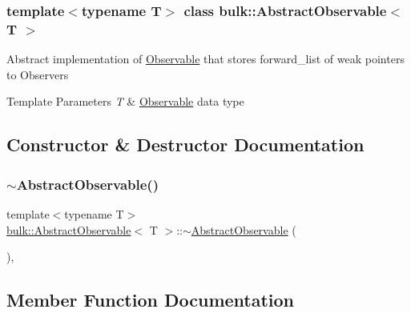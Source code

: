 \subsubsection*{template$<$typename T$>$\newline
class bulk\+::\+Abstract\+Observable$<$ T $>$}

Abstract implementation of \hyperlink{classbulk_1_1Observable}{Observable} that stores forward\+\_\+list of weak pointers to Observers 
\begin{DoxyTemplParams}{Template Parameters}
{\em T} & \hyperlink{classbulk_1_1Observable}{Observable} data type \\
\hline
\end{DoxyTemplParams}


\subsection{Constructor \& Destructor Documentation}
\mbox{\label{classbulk_1_1AbstractObservable_a8fe881a61345c8df0c201a2e266605ef}} 
\subsubsection{\texorpdfstring{$\sim$\+Abstract\+Observable()}{~AbstractObservable()}}
{\footnotesize\ttfamily template$<$typename T$>$ \\
\hyperlink{classbulk_1_1AbstractObservable}{bulk\+::\+Abstract\+Observable}$<$ T $>$\+::$\sim$\hyperlink{classbulk_1_1AbstractObservable}{Abstract\+Observable} (\begin{DoxyParamCaption}{ }\end{DoxyParamCaption})\hspace{0.3cm}{\ttfamily [override]}, {\ttfamily [default]}}



\subsection{Member Function Documentation}
\mbox{\label{classbulk_1_1AbstractObservable_a39be332eeed3b432a461faae184ba34b}} 

